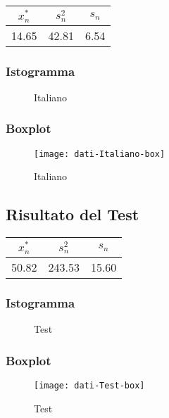\begin{center}
\begin{tabular}{|c|c|c|}
  \hline
  \(x_{n}^{*}\) & \(s_n^2\) & \(s_n\) \\
  \hline
  14.65 & 42.81 & 6.54 \\
  \hline
\end{tabular}
\end{center}

\subsubsection{Istogramma}
\begin{figure}[!h]
  \caption{Italiano}
\end{figure}

\subsubsection{Boxplot}
\begin{figure}[!h]
  \centering
  \texttt{[image: dati-Italiano-box]}
  \caption{Italiano}
\end{figure}
\restoregeometry
\clearpage

\thispagestyle{empty} %
\subsection{Risultato del Test}

\begin{center}
\begin{tabular}{|c|c|c|}
  \hline
  \(x_{n}^{*}\) & \(s_n^2\) & \(s_n\) \\
  \hline
  50.82 & 243.53 & 15.60 \\
  \hline
\end{tabular}
\end{center}

\subsubsection{Istogramma}
\begin{figure}[!h]
  \caption{Test}
\end{figure}

\subsubsection{Boxplot}
\begin{figure}[!h]
  \centering
  \texttt{[image: dati-Test-box]}
  \caption{Test}
\end{figure}
\restoregeometry
\clearpage

